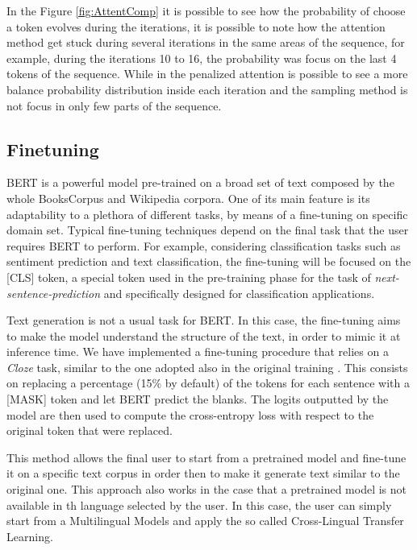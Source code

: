 \documentclass[10pt,twocolumn,letterpaper]{article}
\begin{document}
In the Figure \ref{fig:AttentComp} it is possible to see how the probability of choose a token evolves
during the iterations, it is possible to note how the attention method
get stuck during several iterations in the same areas of the sequence, for example, during the iterations
10 to 16, the probability was focus on the last 4 tokens of the sequence.
While in the penalized attention is possible to see a more balance probability distribution inside each iteration
and the sampling method is not focus in only few parts of the sequence.
\subsection{Finetuning}
BERT is a powerful model pre-trained on a broad set of text composed by the whole
BooksCorpus and Wikipedia corpora.
One of its main feature is its adaptability to a plethora of different tasks,
by means of a fine-tuning on specific domain set.
Typical fine-tuning techniques depend on the final task that the user requires BERT to perform.
For example, considering classification tasks such as sentiment prediction and text classification,
the fine-tuning will be focused on the [CLS] token, a special token used in the pre-training
phase for the task of \textit{next-sentence-prediction} and specifically designed for classification applications.

Text generation is not a usual task for BERT.
In this case, the fine-tuning aims to make the model understand the structure of the text,
in order to mimic it at inference time.
We have implemented a fine-tuning procedure that relies on a \textit{Cloze} task, similar to the one adopted also in the
 original training \cite{wang2019bert}.
This consists on replacing a percentage (15\% by default) of the tokens for each sentence with a [MASK] token and let
BERT predict the blanks. The logits outputted by the model are then used to compute the cross-entropy
loss with respect to the original token that were replaced.

This method allows the final user to start from a pretrained model and fine-tune it on a specific
text corpus in order then to make it generate text similar to the original one.
This approach also works  in the case that a pretrained model is not available in th language selected by the user.
In this case, the user can simply start from a Multilingual Models and apply the so called Cross-Lingual Transfer Learning.
\end{document}
